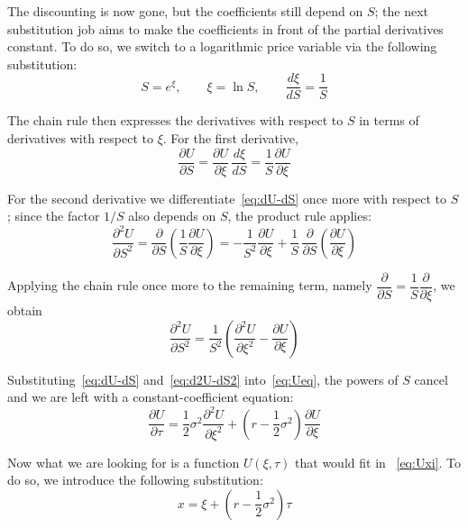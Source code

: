 \documentclass[a4paper,12pt]{article}
\numberwithin{equation}{section}
\begin{document}
The discounting is now gone, but the coefficients still depend on $S$; the next substitution job aims to make the coefficients in front of the partial derivatives constant. To do so, we switch to a logarithmic price variable via the following substitution:
\begin{equation}\label{eq:logsub-1}
  S = e^{\xi}, \qquad \xi = \ln S, \qquad \frac{d\xi}{dS} = \frac{1}{S}
\end{equation}

The chain rule then expresses the derivatives with respect to $S$ in terms of
derivatives with respect to $\xi$. For the first derivative,
\begin{equation}\label{eq:dU-dS}
  \frac{\partial U}{\partial S}
    = \frac{\partial U}{\partial \xi}\,\frac{d\xi}{dS}
    = \frac{1}{S}\frac{\partial U}{\partial \xi}
\end{equation}

For the second derivative we differentiate~\eqref{eq:dU-dS} once more with respect
to $S$; since the factor $1/S$ also depends on $S$, the product rule applies:
\begin{equation}
  \frac{\partial^2 U}{\partial S^2}
    = \frac{\partial}{\partial S}\!\left(\frac{1}{S}\frac{\partial U}{\partial \xi}\right)
    = -\frac{1}{S^2}\frac{\partial U}{\partial \xi}
      + \frac{1}{S}\,\frac{\partial}{\partial S}\!\left(\frac{\partial U}{\partial \xi}\right)
\end{equation}

Applying the chain rule once more to the remaining term, namely
$\dfrac{\partial}{\partial S} = \dfrac{1}{S}\dfrac{\partial}{\partial \xi}$, we obtain
\begin{equation}\label{eq:d2U-dS2}
  \frac{\partial^2 U}{\partial S^2}
    = \frac{1}{S^2}\left(\frac{\partial^2 U}{\partial \xi^2}
      - \frac{\partial U}{\partial \xi}\right)
\end{equation}

Substituting~\eqref{eq:dU-dS} and~\eqref{eq:d2U-dS2} into~\eqref{eq:Ueq}, the powers of $S$ cancel and we are left with a constant-coefficient equation:
\begin{equation}\label{eq:Uxi}
  \frac{\partial U}{\partial \tau}
    = \frac{1}{2}\sigma^2\frac{\partial^2 U}{\partial \xi^2}
    + \left(r - \frac{1}{2}\sigma^2\right)\frac{\partial U}{\partial \xi}
\end{equation}

Now what we are looking for is a function $U(\xi, \tau)$ that would fit in ~\eqref{eq:Uxi}. To do so, we introduce the following substitution:
\begin{equation}\label{eq:subx}
  x = \xi + \left(r - \frac{1}{2}\sigma^2\right)\tau
\end{equation}
\end{document}
